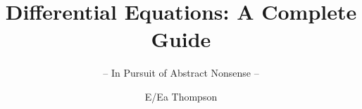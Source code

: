 \documentclass[graybox,envcountchap,sectrefs]{style/svmono}
\begin{document}
\author{E/Ea Thompson}
\title{Differential Equations: A Complete Guide}
\subtitle{-- In Pursuit of Abstract Nonsense --}
\maketitle

\frontmatter%

%
%

%

\tableofcontents

%


\mainmatter%



















\backmatter%

%
%
\printindex

\end{document}
